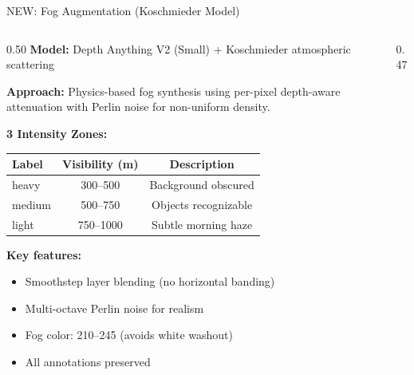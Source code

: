 \documentclass[aspectratio=169, 10pt]{beamer}
\begin{document}
\begin{frame}{NEW: Fog Augmentation (Koschmieder Model)}
\begin{columns}[T]
\begin{column}{0.50\textwidth}
\textbf{Model:} Depth Anything V2 (Small) + Koschmieder atmospheric scattering

\vspace{0.3em}
\textbf{Approach:} Physics-based fog synthesis using per-pixel depth-aware attenuation with Perlin noise for non-uniform density.

\vspace{0.3em}
\textbf{3 Intensity Zones:}

{\scriptsize
\begin{tabular}{lcc}
\toprule
\textbf{Label} & \textbf{Visibility (m)} & \textbf{Description} \\
\midrule
heavy  & 300--500  & Background obscured \\
medium & 500--750  & Objects recognizable \\
light  & 750--1000 & Subtle morning haze \\
\bottomrule
\end{tabular}
}

\vspace{0.3em}
\textbf{Key features:}
\begin{itemize}
    \item Smoothstep layer blending (no horizontal banding)
    \item Multi-octave Perlin noise for realism
    \item Fog color: 210--245 (avoids white washout)
    \item All annotations preserved
\end{itemize}
\end{column}
\begin{column}{0.47\textwidth}
\centering
{}
\end{column}
\end{columns}
\end{frame}
\end{document}
